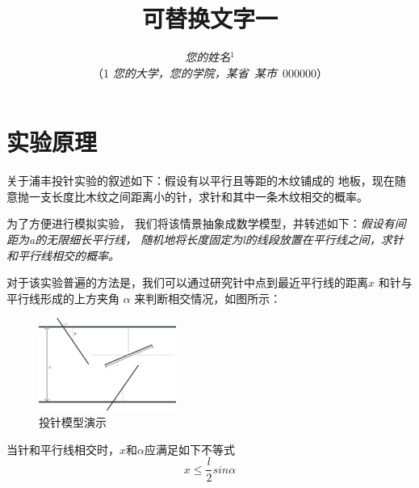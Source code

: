 \documentclass[10pt,a4paper,column,twoside,UTF8]{ctexart}
\begin{document}




	\title{\LARGE\textbf{可替换文字一}}
	\author{\large\textit{您的姓名}$^{1}$\\ \normalsize{（1 \textit{您的大学，您的学院，某省~某市}~000000）}}
	\date{}	%


	\thispagestyle{firstpage}	%
	\pagestyle{maincontent}		%




	\section{实验原理}
		关于浦丰投针实验的叙述如下：假设有以平行且等距的木纹铺成的
		地板，现在随意抛一支长度比木纹之间距离小的针，求针和其中一条木纹相交的概率。
		\par
		为了方便进行模拟实验，
		我们将该情景抽象成数学模型，并转述如下：\emph{假设有间距为a的无限细长平行线，
		随机地将长度固定为l的线段放置在平行线之间，求针和平行线相交的概率。}
		\par
		对于该实验普遍的方法是，我们可以通过研究针中点到最近平行线的距离$x$
		和针与平行线形成的上方夹角 $\alpha$ 来判断相交情况，如图所示：

		\begin{figure}[htbp]
			\centering
			\includegraphics[width=0.4\textwidth]{illustration0.jpeg}
			\caption{投针模型演示}
		\end{figure}
		当针和平行线相交时，$x$和$\alpha$应满足如下不等式
		\begin{equation}
			x \leq \frac{l}{2}sin\alpha
		\end{equation}
\end{document}
